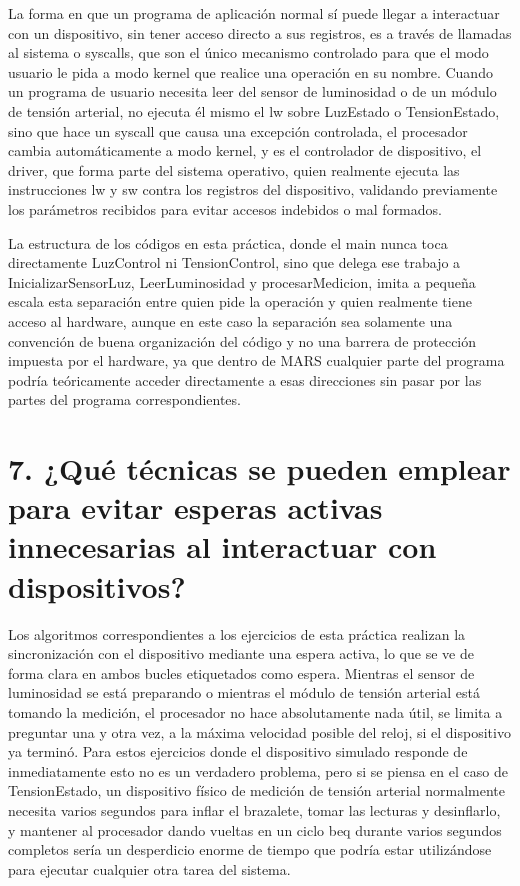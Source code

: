 \documentclass[12pt, letterpaper]{article}
\begin{document}
La forma en que un programa de aplicación normal sí puede llegar a interactuar con un dispositivo, sin tener acceso directo a sus registros, es a través de llamadas al sistema o syscalls, que son el único mecanismo controlado para que el modo usuario le pida a modo kernel que realice una operación en su nombre. Cuando un programa de usuario necesita leer del sensor de luminosidad o de un módulo de tensión arterial, no ejecuta él mismo el lw sobre LuzEstado o TensionEstado, sino que hace un syscall que causa una excepción controlada, el procesador cambia automáticamente a modo kernel, y es el controlador de dispositivo, el driver, que forma parte del sistema operativo, quien realmente ejecuta las instrucciones lw y sw contra los registros del dispositivo, validando previamente los parámetros recibidos para evitar accesos indebidos o mal formados.

La estructura de los códigos en esta práctica, donde el main nunca toca directamente LuzControl ni TensionControl, sino que delega ese trabajo a InicializarSensorLuz, LeerLuminosidad y procesarMedicion, imita a pequeña escala esta separación entre quien pide la operación y quien realmente tiene acceso al hardware, aunque en este caso la separación sea solamente una convención de buena organización del código y no una barrera de protección impuesta por el hardware, ya que dentro de MARS cualquier parte del programa podría teóricamente acceder directamente a esas direcciones sin pasar por las partes del programa correspondientes.\newpage

\section*{\textbf{7. ¿Qué técnicas se pueden emplear para evitar esperas activas innecesarias al interactuar con dispositivos?}}

Los algoritmos correspondientes a los ejercicios de esta práctica realizan la sincronización con el dispositivo mediante una espera activa, lo que se ve de forma clara en ambos bucles etiquetados como espera. Mientras el sensor de luminosidad se está preparando o mientras el módulo de tensión arterial está tomando la medición, el procesador no hace absolutamente nada útil, se limita a preguntar una y otra vez, a la máxima velocidad posible del reloj, si el dispositivo ya terminó. Para estos ejercicios donde el dispositivo simulado responde de inmediatamente esto no es un verdadero problema, pero si se piensa en el caso de TensionEstado, un dispositivo físico de medición de tensión arterial normalmente necesita varios segundos para inflar el brazalete, tomar las lecturas y desinflarlo, y mantener al procesador dando vueltas en un ciclo beq durante varios segundos completos sería un desperdicio enorme de tiempo que podría estar utilizándose para ejecutar cualquier otra tarea del sistema.
\end{document}
